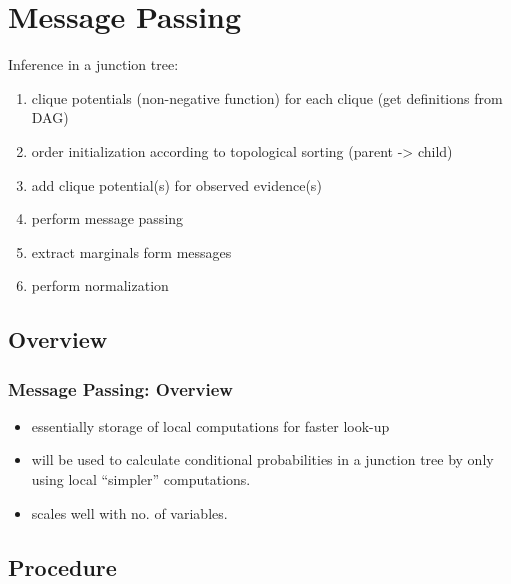 \section{Message Passing}



\begin{frame}

Inference in  a junction tree:

\begin{enumerate}
\item clique potentials (non-negative function) for each clique (get definitions from DAG)
\item order initialization according to topological sorting (parent -> child)
\item add clique potential(s) for observed evidence(s)
\item perform message passing
\item extract marginals form messages
\item perform normalization
\end{enumerate}
\end{frame}

\subsection{Overview}

\begin{frame}\frametitle{Message Passing: Overview}

\begin{itemize}
\item essentially storage of local computations for faster look-up
\item will be used to calculate conditional probabilities in a junction tree by only using local ``simpler'' computations.
\item scales well with no. of variables.
\end{itemize}

\end{frame}

\subsection{Procedure}


